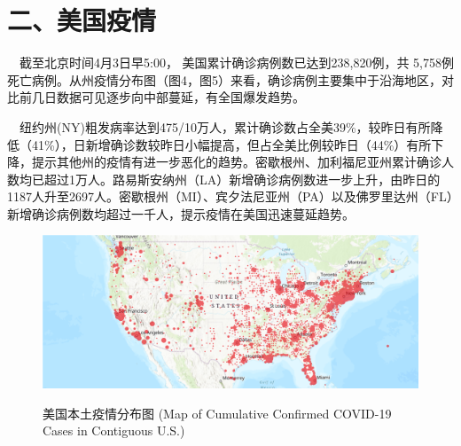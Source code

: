 \documentclass[
]{article}
\begin{document}
\newpage

\hypertarget{section-3}{%
\section{\texorpdfstring{\textcolor{glaucous}{二、美国疫情}}{}}\label{section-3}}

~~截至北京时间4月3日早5:00， 美国累计确诊病例数已达到238,820例，共
5,758例死亡病例。从州疫情分布图（图4，图5）来看，确诊病例主要集中于沿海地区，对比前几日数据可见逐步向中部蔓延，有全国爆发趋势。

~~纽约州(NY)粗发病率达到475/10万人，累计确诊数占全美39\%，较昨日有所降低（41\%），日新增确诊数较昨日小幅提高，但占全美比例较昨日（44\%）有所下降，提示其他州的疫情有进一步恶化的趋势。密歇根州、加利福尼亚州累计确诊人数均已超过1万人。路易斯安纳州（LA）新增确诊病例数进一步上升，由昨日的1187人升至2697人。密歇根州（MI）、宾夕法尼亚州（PA）以及佛罗里达州（FL）新增确诊病例数均超过一千人，提示疫情在美国迅速蔓延趋势。

\begin{figure}[H] 
\caption{美国本土疫情分布图 (Map of Cumulative Confirmed COVID-19 Cases in Contiguous U.S.)} %
\centering
\includegraphics[]{./input/covid4.png} %
\label{} %
\end{figure}
\end{document}
